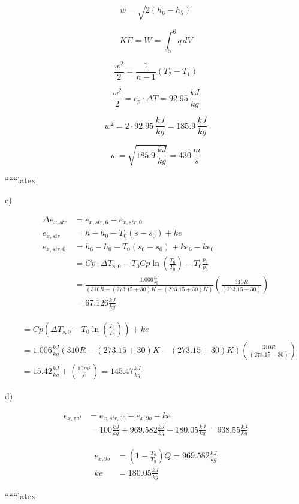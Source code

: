 \[
w = \sqrt{2 \left( h_6 - h_5 \right)}
\]

\[
KE = W = \int_5^6 q \, dV
\]

\[
\frac{w^2}{2} = \frac{1}{n-1} \left( T_2 - T_1 \right)
\]

\[
\frac{w^2}{2} = c_p \cdot \Delta T = 92.95 \, \frac{kJ}{kg}
\]

\[
w^2 = 2 \cdot 92.95 \, \frac{kJ}{kg} = 185.9 \, \frac{kJ}{kg}
\]

\[
w = \sqrt{185.9 \, \frac{kJ}{kg}} = 430 \, \frac{m}{s}
\]

``````latex

c)

\begin{align*}
\Delta e_{x,str} &= e_{x,str,6} - e_{x,str,0} \\
e_{x,str} &= h - h_0 - T_0(s - s_0) + ke \\
e_{x,str,0} &= h_6 - h_0 - T_0(s_6 - s_0) + ke_6 - ke_0 \\
&= Cp \cdot \Delta T_{s,0} - T_0 Cp \ln \left( \frac{T_6}{T_0} \right) - T_0 \frac{p_6}{p_0} \\
&= \frac{1.006 \frac{kJ}{kg}}{(310R - (273.15 + 30)K - (273.15 + 30)K)} \left( \frac{310R}{(273.15 - 30)} \right) \\
&= 67.126 \frac{kJ}{kg}
\end{align*}

\begin{align*}
&= Cp \left( \Delta T_{s,0} - T_0 \ln \left( \frac{T_6}{T_0} \right) \right) + ke \\
&= 1.006 \frac{kJ}{kg} \left( 310R - (273.15 + 30)K - (273.15 + 30)K \right) \left( \frac{310R}{(273.15 - 30)} \right) \\
&= 15.42 \frac{kJ}{kg} + \left( \frac{10 m^2}{s^2} \right) = 145.47 \frac{kJ}{kg}
\end{align*}

d)

\begin{align*}
e_{x,val} &= e_{x,str,06} - e_{x,9b} - ke \\
&= 100 \frac{kJ}{kg} + 969.582 \frac{kJ}{kg} - 180.05 \frac{kJ}{kg} = 938.55 \frac{kJ}{kg}
\end{align*}

\begin{align*}
e_{x,9b} &= \left( 1 - \frac{T_0}{T_9} \right) Q = 969.582 \frac{kJ}{kg} \\
ke &= 180.05 \frac{kJ}{kg}
\end{align*}

``````latex


